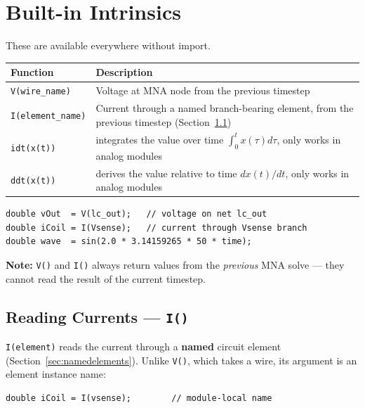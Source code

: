\documentclass[11pt, a4paper]{article}
\newcommand{\code}[1]{\texttt{\small #1}}
\begin{document}
\section{Built-in Intrinsics}

These are available everywhere without import.

\begin{center}
\begin{tabular}{@{} L{4cm} L{9cm} @{}}
  \toprule
  \textbf{Function} & \textbf{Description} \\
  \midrule
  \code{V(wire\_name)}   & Voltage at MNA node from the previous timestep \\
  \code{I(element\_name)}& Current through a named branch-bearing element, from the previous timestep (Section~\ref{sec:currents}) \\
  \code{idt(x(t))}& integrates the value over time $\int_{0}^{t}x(\tau) d\tau $, only works in analog modules \\
  \code{ddt(x(t))}& derives the value relative to time $dx(t)/dt $, only works in analog modules \\

  \bottomrule
\end{tabular}
\end{center}

\begin{lstlisting}
double vOut  = V(lc_out);   // voltage on net lc_out
double iCoil = I(Vsense);   // current through Vsense branch
double wave  = sin(2.0 * 3.14159265 * 50 * time);
\end{lstlisting}

\textbf{Note:} \code{V()} and \code{I()} always return values from the
\textit{previous} MNA solve — they cannot read the result of the current
timestep.

\subsection{Reading Currents --- \code{I()}}
\label{sec:currents}

\code{I(element)} reads the current through a \textbf{named} circuit element
(Section~\ref{sec:namedelements}). Unlike \code{V()}, which takes a wire, its
argument is an element instance name:

\begin{lstlisting}
double iCoil = I(vsense);        // module-local name
\end{lstlisting}
\end{document}
